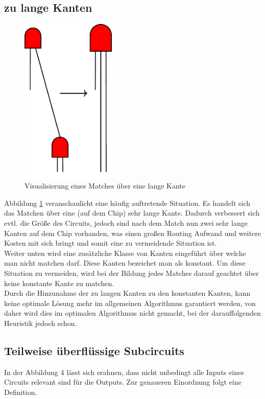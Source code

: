 \documentclass[11pt, a4paper, german]{article}
\begin{document}
\subsection{zu lange Kanten}
\label{subsec:zu_lange_kanten}
 \begin{figure}
		\includegraphics[height = 8cm]{pictures/compiled/zu_lange_kante}
		\caption{Visualisierung eines Matches über eine lange Kante}
		\label{bild:zu_lange_kanten}
\end{figure}
Abbildung \ref{bild:zu_lange_kanten} veranschaulicht eine häufig auftretende Situation. Es handelt sich das Matchen über eine (auf dem Chip) sehr lange Kante. Dadurch verbessert sich evtl. die Größe des Circuits, jedoch sind nach dem Match nun zwei sehr lange Kanten auf dem Chip vorhanden, was   einen großen Routing Aufwand und weitere Kosten mit sich bringt und somit eine zu vermeidende Situation ist. \\
Weiter unten wird eine zusätzliche Klasse von Kanten eingeführt über welche man nicht matchen darf.
Diese Kanten bezeichet man als konstant.
Um diese Situation zu vermeiden, wird bei der Bildung jedes Matches darauf geachtet über keine konstante Kante zu matchen.\\
Durch die Hinzunahme der zu langen Kanten zu den konstanten Kanten, kann keine optimale Lösung mehr im allgemeinen Algorithmus garantiert werden, von daher wird dies im optimalen Algorithmus nicht gemacht, bei der darauffolgenden Heuristik jedoch schon. \\

 \subsection{Teilweise überflüssige Subcircuits}
 \label{subsec:teilweise_ueberfkl_subcircuits}
 In der Abbildung 4 lässt sich erahnen, dass nicht unbedingt alle Inputs eines Circuits relevant sind für die Outputs. Zur genaueren Einordnung folgt eine Definition.\\
 
\end{document}
